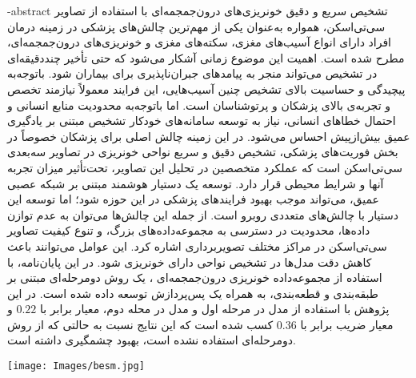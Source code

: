 \department{}



\fa-abstract{
تشخیص سریع و دقیق خونریزی‌های درون‌جمجمه‌ای با استفاده از تصاویر سی‌تی‌اسکن، همواره به‌عنوان یکی از مهم‌ترین چالش‌های پزشکی در زمینه درمان افراد دارای انواع آسیب‌های مغزی، سکته‌های مغزی و خونریزی‌های درون‌جمجمه‌ای، مطرح شده است. اهمیت این موضوع زمانی آشکار می‌شود که حتی تأخیر چنددقیقه‌ای در تشخیص می‌تواند منجر به پیامدهای جبران‌ناپذیری برای بیماران شود.
باتوجه‌به پیچیدگی و حساسیت بالای تشخیص چنین آسیب‌هایی، این فرایند معمولاً نیازمند تخصص و تجربه‌ی بالای پزشکان و پرتوشناسان است. اما باتوجه‌به محدودیت منابع انسانی و احتمال خطاهای انسانی، نیاز به توسعه سامانه‌های خودکار تشخیص مبتنی بر یادگیری عمیق بیش‌ازپیش احساس می‌شود.
در این زمینه چالش اصلی برای پزشکان خصوصاً در بخش فوریت‌های پزشکی، تشخیص دقیق و سریع نواحی خونریزی در تصاویر سه‌بعدی سی‌تی‌اسکن است که عملکرد متخصصین در تحلیل این تصاویر، تحت‌تأثیر میزان تجربه آنها و شرایط محیطی قرار دارد.
توسعه یک دستیار هوشمند مبتنی بر شبکه عصبی عمیق، می‌تواند موجب بهبود فرایندهای پزشکی در این حوزه شود؛ اما توسعه این دستیار با چالش‌های متعددی روبرو است. از جمله این چالش‌ها می‌توان به عدم توازن داده‌ها، محدودیت در دسترسی به مجموعه‌داده‌های بزرگ، و تنوع کیفیت تصاویر سی‌تی‌اسکن در مراکز مختلف تصویربرداری اشاره کرد. این عوامل می‌توانند باعث کاهش دقت مدل‌ها در تشخیص نواحی دارای خونریزی شود. در این پایان‌نامه، با استفاده از مجموعه‌داده خونریزی درون‌جمجمه‌ای 
،
 یک روش دومرحله‌ای مبتنی بر طبقه‌بندی و قطعه‌بندی، به همراه یک پس‌پردازش توسعه داده شده است. در این پژوهش با استفاده از مدل
در مرحله اول و مدل  
در محله دوم، معیار
برابر با 
$0.22$
و معیار ضریب 
برابر با 
$0.36$
کسب شده است که این نتایج نسبت به حالتی که از روش دومرحله‌ای استفاده نشده است،‌ بهبود چشمگیری داشته است.
 }





\KNTUtitle
\vspace*{7cm}
\thispagestyle{empty}
\begin{center}
\texttt{[image: Images/besm.jpg]}
\end{center}